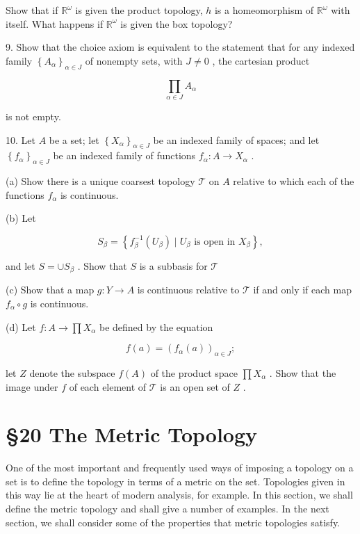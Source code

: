 Show that if \({\mathbb{R}}^{\omega }\) is given the product topology, \(h\) is a homeomorphism of \({\mathbb{R}}^{\omega }\) with itself. What happens if \({\mathbb{R}}^{\omega }\) is given the box topology?

9. Show that the choice axiom is equivalent to the statement that for any indexed family \({\left\{  {A}_{\alpha }\right\}  }_{\alpha  \in  J}\) of nonempty sets, with \(J \neq  0\) , the cartesian product

\[
\mathop{\prod }\limits_{{\alpha  \in  J}}{A}_{\alpha }
\]

is not empty.

10. Let \(A\) be a set; let \({\left\{  {X}_{\alpha }\right\}  }_{\alpha  \in  J}\) be an indexed family of spaces; and let \({\left\{  {f}_{\alpha }\right\}  }_{\alpha  \in  J}\) be an indexed family of functions \({f}_{\alpha } : A \rightarrow  {X}_{\alpha }\) .

(a) Show there is a unique coarsest topology \(\mathcal{T}\) on \(A\) relative to which each of the functions \({f}_{\alpha }\) is continuous.

(b) Let

\[
{S}_{\beta } = \left\{  {{f}_{\beta }^{-1}\left( {U}_{\beta }\right)  \mid  {U}_{\beta }\text{ is open in }{X}_{\beta }}\right\}  ,
\]

and let \(S =  \cup  {S}_{\beta }\) . Show that \(S\) is a subbasis for \(\mathcal{T}\)

(c) Show that a map \(g : Y \rightarrow  A\) is continuous relative to \(\mathcal{T}\) if and only if each map \({f}_{\alpha } \circ  g\) is continuous.

(d) Let \(f : A \rightarrow  \prod {X}_{\alpha }\) be defined by the equation

\[
f\left( a\right)  = {\left( {f}_{\alpha }\left( a\right) \right) }_{\alpha  \in  J};
\]

let \(Z\) denote the subspace \(f\left( A\right)\) of the product space \(\prod {X}_{\alpha }\) . Show that the image under \(f\) of each element of \(\mathcal{T}\) is an open set of \(Z\) .

\section*{§20 The Metric Topology}

One of the most important and frequently used ways of imposing a topology on a set is to define the topology in terms of a metric on the set. Topologies given in this way lie at the heart of modern analysis, for example. In this section, we shall define the metric topology and shall give a number of examples. In the next section, we shall consider some of the properties that metric topologies satisfy.

